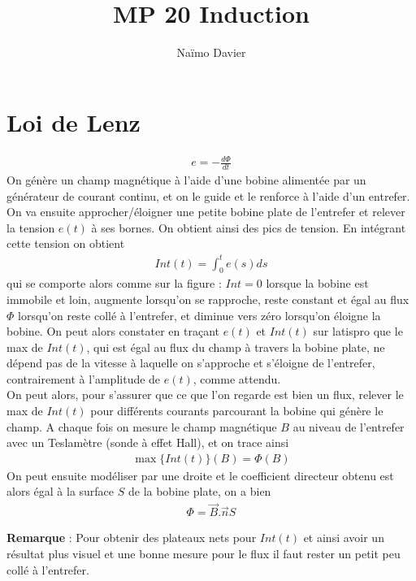 \documentclass[12pt,prb,aps,epsf]{article}
\begin{document}
	
	\title{MP 20 Induction}
	\author{Naïmo Davier}
	
	\maketitle
	
	\tableofcontents
	
	\pagebreak
	

\section{Loi de Lenz}
\begin{eqnarray}
e = -\frac{d\Phi}{dt}
\end{eqnarray}
On génère un champ magnétique à l'aide d'une bobine alimentée par un générateur de courant continu, et on le guide et le renforce à l'aide d'un entrefer. On va ensuite approcher/éloigner une petite bobine plate de l'entrefer et relever la tension $e(t)$ à ses bornes. On obtient ainsi des pics de tension. En intégrant cette tension on obtient
\begin{eqnarray}
Int(t) = \int_0^te(s)ds
\end{eqnarray}
qui se comporte alors comme sur la figure : $Int=0$ lorsque la bobine est immobile et loin, augmente lorsqu'on se rapproche, reste constant et égal au flux $\Phi$ lorsqu'on reste collé à l'entrefer, et diminue vers zéro lorsqu'on éloigne la bobine. On peut alors constater en traçant $e(t)$ et $Int(t)$ sur latispro que le max de $Int(t)$, qui est égal au flux du champ à travers la bobine plate, ne dépend pas de la vitesse à laquelle on s'approche et s'éloigne de l'entrefer, contrairement à l'amplitude de $e(t)$, comme attendu.\\

On peut alors, pour s'assurer que ce que l'on regarde est bien un flux, relever le max de $Int(t)$ pour différents courants parcourant la bobine qui génère le champ. A chaque fois on mesure le champ magnétique $B$ au niveau de l'entrefer avec un Teslamètre (sonde à effet Hall), et on trace ainsi 
\begin{eqnarray}
\max\{Int(t)\}(B) = \Phi(B)
\end{eqnarray}
On peut ensuite modéliser par une droite et le coefficient directeur obtenu est alors égal à la surface $S$ de la bobine plate, on a bien 
\begin{eqnarray}
\Phi = \vec{B}.\vec{n}S
\end{eqnarray}

\textbf{Remarque} : Pour obtenir des plateaux nets pour $Int(t)$ et ainsi avoir un résultat plus visuel et une bonne mesure pour le flux il faut rester un petit peu collé à l'entrefer.\\
\end{document}
